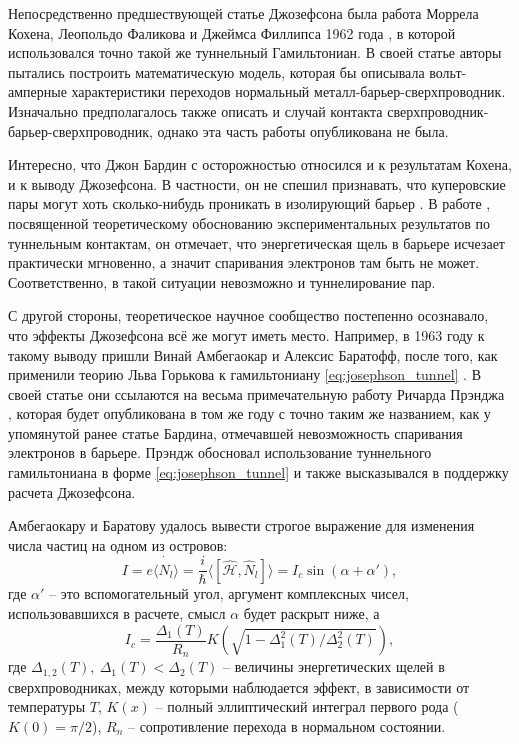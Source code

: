 \documentclass[14pt, a4paper]{extreport}
\numberwithin{equation}{section}
\begin{document}
Непосредственно предшествующей статье Джозефсона была работа Моррела Кохена, Леопольдо Фаликова и Джеймса Филлипса 1962 года \cite{cohen1962superconductive}, в которой использовался точно такой же туннельный Гамильтониан. В своей статье авторы пытались построить математическую модель, которая бы описывала вольт-амперные характеристики переходов нормальный металл-барьер-сверхпроводник. Изначально предполагалось также описать и случай контакта сверхпроводник-барьер-сверхпроводник, однако эта часть работы опубликована не была. 

Интересно, что Джон Бардин с осторожностью относился и к результатам Кохена, и к выводу Джозефсона. В частности, он не спешил признавать, что куперовские пары могут хоть сколько-нибудь проникать в изолирующий барьер \cite{josephsonnobel}. В работе \cite{bardeen1961tunnelling}, посвященной теоретическому обоснованию экспериментальных результатов по туннельным контактам, он отмечает, что энергетическая щель в барьере исчезает практически мгновенно, а значит спаривания электронов там быть не может. Соответственно, в такой ситуации невозможно и туннелирование пар.

С другой стороны, теоретическое научное сообщество постепенно осознавало, что эффекты Джозефсона всё же могут иметь место. Например, в 1963 году к такому выводу пришли Винай Амбегаокар и Алексис Баратофф, после того, как применили теорию Льва Горькова к гамильтониану \eqref{eq:josephson_tunnel} \cite{ambegaokar1963tunneling}. В своей статье они ссылаются на весьма примечательную работу Ричарда Прэнджа \cite{prange1963tunneling}, которая будет опубликована в том же году с точно таким же названием, как у упомянутой ранее статье Бардина, отмечавшей невозможность спаривания электронов в барьере. Прэндж обосновал использование туннельного гамильтониана в форме \eqref{eq:josephson_tunnel} и также высказывался в поддержку расчета Джозефсона.

Амбегаокару и Баратову удалось вывести строгое выражение для изменения числа частиц на одном из островов:
\begin{equation}
	I = e \langle \dot{\hat{N_l}} \rangle =  \frac{i}{\hbar}\langle [\hat{\mathcal{H}}, \hat N_l] \rangle = I_c \sin(\alpha + \alpha'),
\end{equation}
где $\alpha'$ -- это вспомогательный угол, аргумент комплексных чисел, использовавшихся в расчете, смысл $\alpha$ будет раскрыт ниже, а 
\begin{equation}
	I_c = \frac{\Delta_1(T)}{R_n} K \left(\sqrt{1 - \Delta_1^2(T)/\Delta_2^2(T)}\right),
\end{equation}
где $\Delta_{1,2}(T),\ \Delta_1(T) < \Delta_2(T)$ -- величины энергетических щелей в сверхпроводниках, между которыми наблюдается эффект, в зависимости от температуры $T$, $K(x)$ -- полный эллиптический интеграл первого рода ($K(0) = \pi/2$), $R_n$ -- сопротивление перехода в нормальном состоянии.
\end{document}
